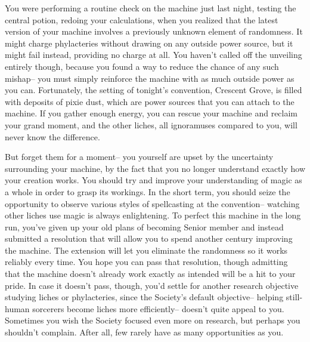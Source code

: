 \documentclass[char]{Sel}
\begin{document}
You were performing a routine check on the machine just last night, testing the central potion, redoing your calculations, when you realized that the latest version of your machine involves a previously unknown element of randomness. It might charge phylacteries without drawing on any outside power source, but it might fail instead, providing no charge at all. You haven't called off the unveiling entirely though, because you found a way to reduce the chance of any such mishap-- you must simply reinforce the machine with as much outside power as you can. Fortunately, the setting of tonight's convention, Crescent Grove, is filled with deposits of pixie dust, which are power sources that you can attach to the machine. If you gather enough energy, you can rescue your machine and reclaim your grand moment, and the other liches, all ignoramuses compared to you, will never know the difference.

But forget them for a moment-- you yourself are upset by the uncertainty surrounding your machine, by the fact that you no longer understand exactly how your creation works. You should try and improve your understanding of magic as a whole in order to grasp its workings. In the short term, you should seize the opportunity to observe various styles of spellcasting at the convention-- watching other liches use magic is always enlightening. To perfect this machine in the long run, you've given up your old plans of becoming Senior member and instead submitted a resolution that will allow you to spend another century improving the machine. The extension will let you eliminate the randomness so it works reliably every time. You hope you can pass that resolution, though admitting that the machine doesn't already work exactly as intended will be a hit to your pride. In case it doesn't pass, though, you'd settle for another research objective studying liches or phylacteries, since the Society's default objective-- helping still-human sorcerers become liches more efficiently-- doesn't quite appeal to you. Sometimes you wish the Society focused even more on research, but perhaps you shouldn't complain. After all, few rarely have as many opportunities as you.
\end{document}
